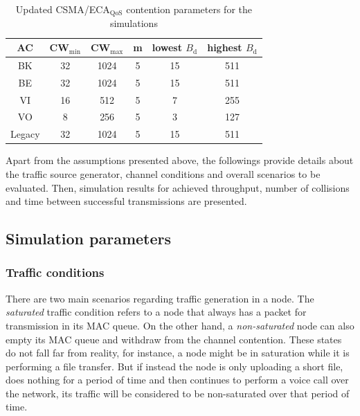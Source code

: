 	\begin{table}[t]
		\centering
		\caption{Updated CSMA/ECA$_{\text{QoS}}$ contention parameters for the simulations}
		\label{tab:newQoSparams}
		\begin{tabular}{|c|c|c|c|c|c|}
			\hline
			{\bfseries AC} & {\bfseries CW$_{\min}$} & {\bfseries CW$_{\max}$} & {\bfseries m} & {\bfseries lowest $B_{\text{d}}$} & {\bfseries highest $B_{\text{d}}$}\\
			\hline
			BK		       &	32				&		1024		  & 		5	&			15		        &		511\\
			BE		       &	32				&		1024		  &		5	&			15		        &		511\\
			VI		       &	16				&		512		  & 		5	&			7		        &		255\\
			VO		       &	8				&		256		  & 		5	&			3		        &		127\\
			Legacy	       &	32				&		1024		  & 		5	&			15		        &		511\\
			\hline
		\end{tabular}
	\end{table}
	
Apart from the assumptions presented above, the followings provide details about the traffic source generator, channel conditions and overall scenarios to be evaluated. Then, simulation results for achieved throughput, number of collisions and time between successful transmissions are presented.

\subsection{Simulation parameters}\label{subsect:simParams}
\subsubsection{Traffic conditions}
There are two main scenarios regarding traffic generation in a node. The \emph{saturated} traffic condition refers to a node that always has a packet for transmission in its MAC queue. On the other hand, a \emph{non-saturated} node  can also empty its MAC queue and withdraw from the channel contention. These states do not fall far from reality, for instance, a node might be in saturation while it is performing a file transfer. But if instead the node is only uploading a short file, does nothing for a period of time and then continues to perform a voice call over the network, its traffic will be considered to be non-saturated over that period of time.

